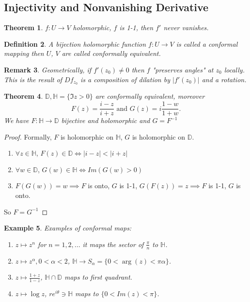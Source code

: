 \documentclass[a4paper]{article}
\newtheorem{thm}{Theorem}[section]
\newtheorem{defn}[thm]{Definition}
\newtheorem{eg}[thm]{Example}
\newtheorem{rmk}[thm]{Remark}
\begin{document}
\subsection{Injectivity and Nonvanishing Derivative}
\begin{thm}
    $f:U\to V$ holomorphic, $f$ is 1-1, then $f'$ never vanishes. 
\end{thm}
\begin{defn}
    A bijection holomorphic function $f:U\to V$ is called a conformal mapping then $U$, $V$ are called conformally equivalent. 
\end{defn}
\begin{rmk}
    Geometrically, if $f'(z_0)\neq 0$ then $f$ "preserves angles" at $z_0$ locally. This is the result of $D f_{z_0}$ is a composition of dilation by $|f'(z_0)|$ and a rotation. 
\end{rmk}
\begin{thm}
    $\mathbb{D}, \mathbb{H}= \{\Im z>0\}$ are conformally equivalent, moreover 
    \[
    F(z)= \frac{i-z}{i+z} \text{ and } G(z)=i \frac{1-w}{1+w}
    .\] 
    We have $F:\mathbb{H}\to \mathbb{D}$ bijective and holomorphic and $G=F^{-1}$
\end{thm}
\begin{proof}
    Formally, $F$ is holomorphic on $\mathbb{H}$, $G$ is holomorphic on $\mathbb{D}$. 
    \begin{enumerate}
        \item $\forall z\in \mathbb{H}$, $F(z)\in \mathbb{D}\iff |i-z|<|i+z|$
        \item $\forall w\in \mathbb{D}$, $G(w)\in \mathbb{H}\iff Im(G(w)>0)$
        \item $F(G(w))=w\implies F$ is onto, $G$ is 1-1, $G(F(z))=z\implies F$ is 1-1, $G$ is onto. 
    \end{enumerate}
    So $F=G^{-1}$ 
\end{proof}
\begin{eg}
    Examples of conformal maps:
    \begin{enumerate}
        \item $z\mapsto z^n$ for $n=1,2,...$ it maps the sector of $\frac{\pi}{n}$ to $\mathbb{H}$. 
        \item $z\mapsto z^\alpha, 0<\alpha <2$, $\mathbb{H}\to S_\alpha= \{0<\arg(z)<\pi \alpha\}$. 
        \item $z\mapsto \frac{1+z}{1-z}$, $\mathbb{H}\cap \mathbb{D}$ maps to first quadrant. 
        \item $z\mapsto \log z$, $re^{i\theta}\ni \mathbb{H}$ maps to $ \{0<Im(z)<\pi\}$. 
    \end{enumerate}
\end{eg}
\end{document}
